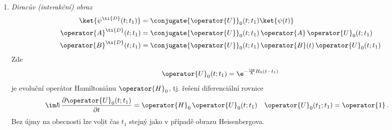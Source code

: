 \begin{enumerate}
\item\emph{Diracův (interakční) obraz}
    \begin{subequations}
        \begin{align}
            \ket{\psi^{\ti{D}}(t;t_{1})}
                &=\conjugate{\operator{U}}_{0}(t;t_{1})\ket{\psi(t)}\\
            \operator{A}^{\ti{D}}(t;t_{1})
                &=\conjugate{\operator{U}}_{0}(t;t_{1})\,\operator{A}\,\operator{U}_{0}(t;t_{1})\\
            \operator{B}^{\ti{D}}(t;t_{1})
                &=\conjugate{\operator{U}}_{0}(t;t_{1})\,\operator{B}(t)\,\operator{U}_{0}(t;t_{1})
        \end{align}            
    \end{subequations}
    Zde 
    \begin{equation}
        \operator{U}_{0}(t;t_{1})
            =\e^{-\frac{\im}{\hbar}H_{0}(t-t_{1})}
    \end{equation}
    je evoluční operátor Hamiltoniánu $\operator{H}_{0}$, tj. řešení diferenciální rovnice
    \begin{align}
        \im\hbar\,\frac{\partial\operator{U}_{0}(t;t_{1})}{\partial t}
            &=\operator{H}_{0}\,\operator{U}_{0}(t;t_{1})
            &\operator{U}_{0}(t_{1};t_{1})
            &=\operator{1}\,.
    \end{align}
    Bez újmy na obecnosti lze volit čas $t_{1}$ stejný jako v případě obrazu Heisenbergova.
    

\end{enumerate}

